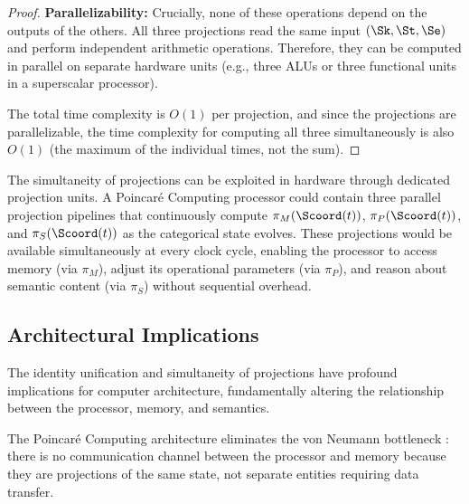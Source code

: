 \begin{proof}
\textbf{Parallelizability:} Crucially, none of these operations depend on the outputs of the others. All three projections read the same input $(\Sk, \St, \Se)$ and perform independent arithmetic operations. Therefore, they can be computed in parallel on separate hardware units (e.g., three ALUs or three functional units in a superscalar processor).

The total time complexity is $O(1)$ per projection, and since the projections are parallelizable, the time complexity for computing all three simultaneously is also $O(1)$ (the maximum of the individual times, not the sum).
\end{proof}

\begin{remark}
\label{rem:hardware_implementation}
The simultaneity of projections can be exploited in hardware through dedicated projection units. A Poincaré Computing processor could contain three parallel projection pipelines that continuously compute $\pi_M(\Scoord(t))$, $\pi_P(\Scoord(t))$, and $\pi_S(\Scoord(t))$ as the categorical state evolves. These projections would be available simultaneously at every clock cycle, enabling the processor to access memory (via $\pi_M$), adjust its operational parameters (via $\pi_P$), and reason about semantic content (via $\pi_S$) without sequential overhead.
\end{remark}

\subsection{Architectural Implications}

The identity unification and simultaneity of projections have profound implications for computer architecture, fundamentally altering the relationship between the processor, memory, and semantics.

\begin{proposition}
\label{prop:bottleneck_elimination}
The Poincaré Computing architecture eliminates the von Neumann bottleneck \citep{backus1978can}: there is no communication channel between the processor and memory because they are projections of the same state, not separate entities requiring data transfer.
\end{proposition}

